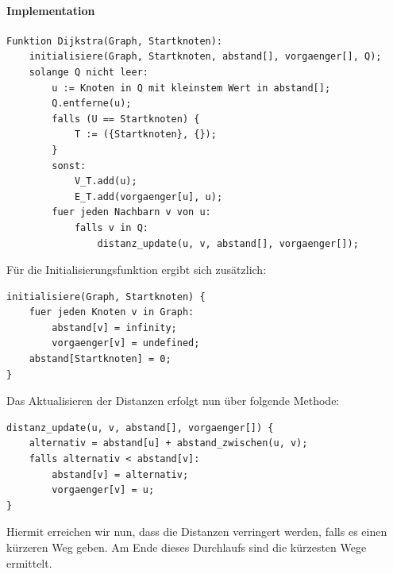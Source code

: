 \documentclass[11pt,a4paper]{scrartcl}
\begin{document}
\paragraph{Implementation} \quad
\begin{lstlisting}
Funktion Dijkstra(Graph, Startknoten):
	initialisiere(Graph, Startknoten, abstand[], vorgaenger[], Q);
	solange Q nicht leer:
		u := Knoten in Q mit kleinstem Wert in abstand[];
		Q.entferne(u);
		falls (U == Startknoten) {
			T := ({Startknoten}, {});		 		
		}
		sonst:
			V_T.add(u);
			E_T.add(vorgaenger[u], u);
		fuer jeden Nachbarn v von u:
			falls v in Q:
				distanz_update(u, v, abstand[], vorgaenger[]);
\end{lstlisting}
Für die Initialisierungsfunktion ergibt sich zusätzlich:
\begin{lstlisting}
initialisiere(Graph, Startknoten) {
	fuer jeden Knoten v in Graph:
		abstand[v] = infinity;
		vorgaenger[v] = undefined;
	abstand[Startknoten] = 0;
}
\end{lstlisting}
Das Aktualisieren der Distanzen erfolgt nun über folgende Methode:
\begin{lstlisting}
distanz_update(u, v, abstand[], vorgaenger[]) {
	alternativ = abstand[u] + abstand_zwischen(u, v);
	falls alternativ < abstand[v]:
		abstand[v] = alternativ;
		vorgaenger[v] = u;
}
\end{lstlisting}
Hiermit erreichen wir nun, dass die Distanzen verringert werden, falls es einen kürzeren Weg geben. Am Ende dieses Durchlaufs sind die kürzesten Wege ermittelt. \\
\pagebreak
\end{document}
